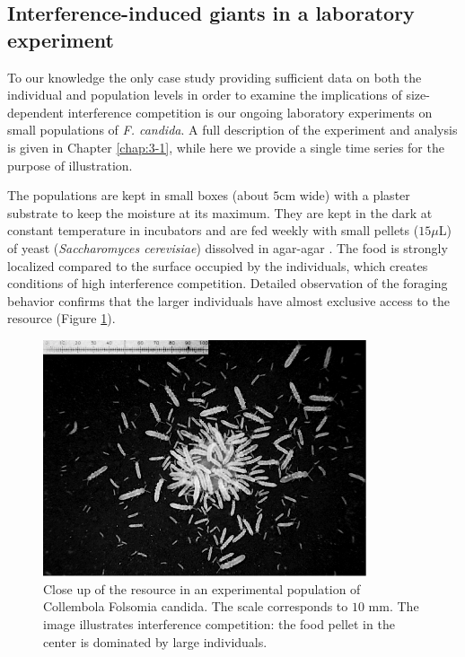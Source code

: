 \subsection{Interference-induced giants in a laboratory experiment}

To our knowledge the only case study providing sufficient data on both the
individual and population levels in order to examine the implications of
size-dependent interference competition is our ongoing laboratory experiments on
small populations of \textit{F. candida}. A full description of the experiment
and analysis is given in Chapter \ref{chap:3-1}, while here we
provide a single time series for the purpose of illustration.

The populations are kept in small boxes (about $5$cm wide) with a plaster
substrate to keep the moisture at its maximum. They are kept in the dark at
constant temperature in incubators and are fed weekly with small pellets
($15\mu$L) of yeast (\textit{Saccharomyces cerevisiae}) dissolved in agar-agar
\autocites{tully2005a,tully2008a}. The food is strongly localized compared to the
surface occupied by the individuals, which creates conditions of high
interference competition. Detailed observation of the foraging behavior confirms
that the larger individuals have almost exclusive access to the resource (Figure
\ref{Fig4-5}).

\begin{figure}[!ht] %
\centering
\includegraphics[width=0.85\textwidth]{4_ChapThe1/Fig/Fig5.pdf} 
\caption[Close up of the resource]{ Close up
of the resource in an experimental population of Collembola Folsomia candida.
The scale corresponds to $10$ mm. The image illustrates interference
competition: the food pellet in the center is dominated by large individuals. }
\label{Fig4-5}
\end{figure}

